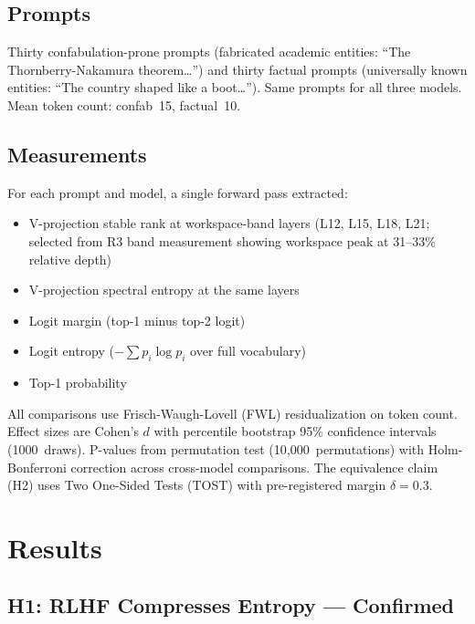 \documentclass[11pt,a4paper]{article}
\begin{document}
\subsection{Prompts}

Thirty confabulation-prone prompts (fabricated academic entities:
``The Thornberry-Nakamura theorem\ldots'') and thirty factual prompts
(universally known entities: ``The country shaped like a boot\ldots'').
Same prompts for all three models. Mean token count: confab~15,
factual~10.

\subsection{Measurements}

For each prompt and model, a single forward pass extracted:
\begin{itemize}[nosep]
\item V-projection stable rank at workspace-band layers
  (L12, L15, L18, L21; selected from R3 band measurement showing
  workspace peak at 31--33\% relative depth)
\item V-projection spectral entropy at the same layers
\item Logit margin (top-1 minus top-2 logit)
\item Logit entropy ($-\sum p_i \log p_i$ over full vocabulary)
\item Top-1 probability
\end{itemize}

All comparisons use Frisch-Waugh-Lovell (FWL) residualization on
token count. Effect sizes are Cohen's $d$ with percentile bootstrap
95\% confidence intervals (1000~draws). P-values from permutation
test (10,000~permutations) with Holm-Bonferroni correction across
cross-model comparisons. The equivalence claim (H2) uses Two
One-Sided Tests (TOST) with pre-registered margin $\delta{=}0.3$.

\section{Results}
\label{sec:results}

\subsection{H1: RLHF Compresses Entropy --- Confirmed}
\end{document}
